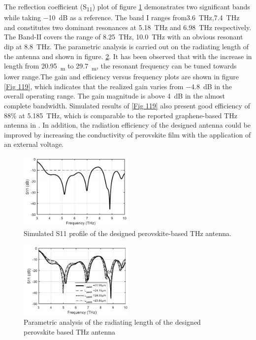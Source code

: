 \documentclass[12pt]{suhbook}
\begin{document}
The reflection coefficient (\si{S_{11}}) plot of figure \ref{Fig 17} demonstrates two significant bands while taking \SI{-10 }{\deci\bel} as a reference. The band I ranges from\SI{3.6}{\THz},\SI{7.4}{\THz} and constitutes two dominant resonances at \SI{5.18}{\THz} and \SI{6.98}{\THz} respectively. The Band-II covers the range of \SI{8.25}{\THz}, \SI{10.0}{\THz} with an obvious resonant dip at \SI{8.8}{\THz}. The parametric analysis is carried out on the radiating length of the antenna and shown in figure. \ref{Fig 18}. It has been observed that with the increase in length from \SI{20.95}{\mu_m} to \SI{29.7}{\mu_m}, the resonant frequency can be tuned towards lower range.The gain and efficiency versus frequency plots are shown in figure \ref{Fig 119}, which indicates that the realized gain varies from \SI{-4.8 }{\deci\bel} in the overall operating range. The gain magnitude is above \SI{4 }{\deci\bel} in the almost complete bandwidth. Simulated results of \ref{Fig 119} also present good efficiency of 88\% at \SI{5.185}{\THz}, which is comparable to the reported graphene-based THz antenna in \cite{dashti2018graphene}. In addition, the radiation efficiency of the designed antenna could be improved by increasing the conductivity of perovskite film with the application of an external voltage.\\
\begin{figure}[hbt!]
\centering
\includegraphics[width=0.5\textwidth]{17}
\caption{Simulated S11 profile of the designed perovskite-based THz antenna.}
\label{Fig 17}
\end{figure}
\begin{figure}[hbt!]
\centering
\includegraphics[width=0.5\textwidth]{18}
\caption{Parametric analysis of the radiating length of the designed perovskite based THz antenna}
\label{Fig 18}
\end{figure}
\end{document}
